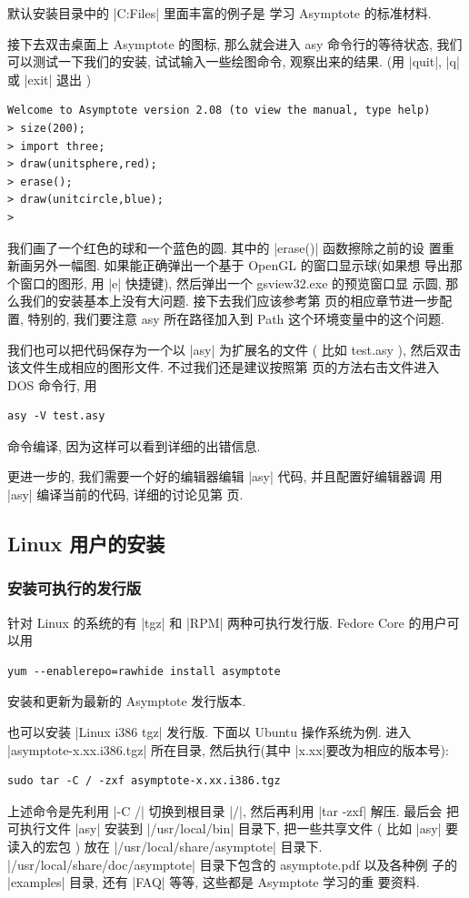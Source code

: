 \documentclass[nofonts,CJKnormalspaces]{ctexbook}
\begin{document}
默认安装目录中的 |C:\Program Files\Asymptote\examples| 里面丰富的例子是
学习 Asymptote 的标准材料.

接下去双击桌面上 Asymptote 的图标, 那么就会进入 asy 命令行的等待状态,
我们可以测试一下我们的安装, 试试输入一些绘图命令, 观察出来的结果. (用
|quit|, |q| 或 |exit| 退出 )
\begin{verbatim}
Welcome to Asymptote version 2.08 (to view the manual, type help)
> size(200);
> import three;
> draw(unitsphere,red);
> erase();
> draw(unitcircle,blue);
>
\end{verbatim}
我们画了一个红色的球和一个蓝色的圆. 其中的 |erase()| 函数擦除之前的设
置重新画另外一幅图. 如果能正确弹出一个基于 OpenGL 的窗口显示球(如果想
导出那个窗口的图形, 用 |e| 快捷键), 然后弹出一个 gsview32.exe 的预览窗口显
示圆, 那么我们的安装基本上没有大问题. 接下去我们应该参考第
\pageref{asy:Settings} 页的相应章节进一步配置, 特别的, 我们要注意 asy
所在路径加入到 Path 这个环境变量中的这个问题.

我们也可以把代码保存为一个以 |asy| 为扩展名的文件 ( 比如 test.asy ),
然后双击该文件生成相应的图形文件. 不过我们还是建议按照第
\pageref{Windows:DOS} 页的方法右击文件进入 DOS 命令行, 用
\begin{verbatim}
asy -V test.asy
\end{verbatim}
命令编译, 因为这样可以看到详细的出错信息.

更进一步的, 我们需要一个好的编辑器编辑 |asy| 代码, 并且配置好编辑器调
用 |asy| 编译当前的代码, 详细的讨论见第 \pageref{asy:Editors} 页.

\subsection{Linux 用户的安装}
\subsubsection{安装可执行的发行版}
针对 Linux 的系统的有 |tgz| 和 |RPM| 两种可执行发行版.
Fedore Core 的用户可以用
\begin{verbatim}
yum --enablerepo=rawhide install asymptote
\end{verbatim}
安装和更新为最新的 Asymptote 发行版本.

也可以安装 |Linux i386 tgz| 发行版. 下面以
Ubuntu 操作系统为例. 进入 |asymptote-x.xx.i386.tgz| 所在目录,
然后执行(其中 |x.xx|要改为相应的版本号):

\begin{verbatim}
sudo tar -C / -zxf asymptote-x.xx.i386.tgz
\end{verbatim}
上述命令是先利用 |-C /| 切换到根目录 |/|, 然后再利用 |tar -zxf| 解压. 最后会
把可执行文件 |asy| 安装到 |/usr/local/bin| 目录下, 把一些共享文件
( 比如 |asy| 要读入的宏包 ) 放在 |/usr/local/share/asymptote| 目录下.
|/usr/local/share/doc/asymptote| 目录下包含的 asymptote.pdf 以及各种例
子的 |examples| 目录, 还有 |FAQ| 等等, 这些都是 Asymptote 学习的重
要资料.
\end{document}
